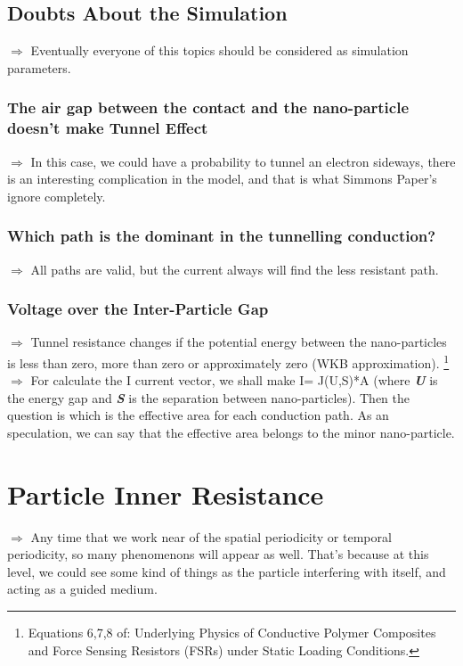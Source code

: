 \documentclass[11pt,a4paper,draft]{article}
\begin{document}
\subsection{Doubts About the Simulation}
$\Rightarrow$ Eventually everyone of this topics should be considered as simulation parameters.
\subsubsection{The air gap between the contact and the nano-particle doesn't make Tunnel Effect}
$\Rightarrow$ In this case, we could have a probability to tunnel an electron sideways, there is an interesting complication in the model, and that is what Simmons Paper's ignore completely.
\subsubsection{Which path is the dominant in the tunnelling conduction?}
$\Rightarrow$ All paths are valid, but the current always will find the less resistant path.
\subsubsection{Voltage over the Inter-Particle Gap}
$\Rightarrow$ Tunnel resistance changes if the potential energy between the nano-particles is less than zero, more than zero or approximately zero (WKB approximation). \footnote{Equations 6,7,8 of: Underlying Physics of Conductive Polymer Composites and Force Sensing Resistors (FSRs) under Static Loading Conditions.}\\
$\Rightarrow$ For calculate the I current vector, we shall make I= J(U,S)*A (where \emph{\textbf{U}} is the energy gap and \emph{\textbf{S}} is the separation between nano-particles). Then the question is which is the effective area for each conduction path. As an speculation, we can say that the effective area belongs to the minor nano-particle. 
\section{Particle Inner Resistance}
$\Rightarrow$ Any time that we work near of the spatial periodicity or temporal periodicity, so many phenomenons will appear as well. That's because at this level, we could see some kind of things as the particle interfering with itself, and acting as a guided medium. 
\end{document}
